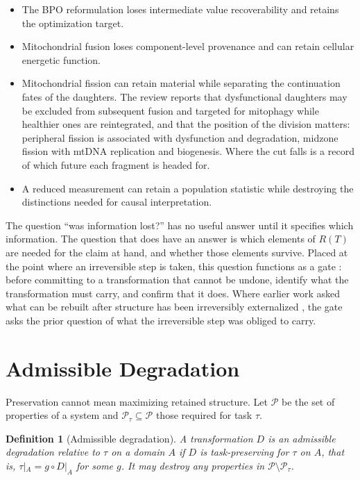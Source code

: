 \documentclass[11pt]{article}
\newtheorem{definition}{Definition}
\theoremstyle{remark}
\begin{document}
\begin{itemize}[leftmargin=1.5em]
\item The BPO reformulation loses intermediate value recoverability and retains the optimization target.
\item Mitochondrial fusion loses component-level provenance and can retain cellular energetic function.
\item Mitochondrial fission can retain material while separating the continuation fates of the daughters. The review reports that dysfunctional daughters may be excluded from subsequent fusion and targeted for mitophagy while healthier ones are reintegrated, and that the position of the division matters: peripheral fission is associated with dysfunction and degradation, midzone fission with mtDNA replication and biogenesis. Where the cut falls is a record of which future each fragment is headed for.
\item A reduced measurement can retain a population statistic while destroying the distinctions needed for causal interpretation.
\end{itemize}

The question ``was information lost?'' has no useful answer until it specifies which information. The question that does have an answer is which elements of $R(T)$ are needed for the claim at hand, and whether those elements survive. Placed at the point where an irreversible step is taken, this question functions as a gate \cite{reversibility}: before committing to a transformation that cannot be undone, identify what the transformation must carry, and confirm that it does. Where earlier work asked what can be rebuilt after structure has been irreversibly externalized \cite{reconstruction}, the gate asks the prior question of what the irreversible step was obliged to carry.

\section{Admissible Degradation}

Preservation cannot mean maximizing retained structure. Let $\mathcal P$ be the set of properties of a system and $\mathcal P_\tau\subseteq\mathcal P$ those required for task $\tau$.

\begin{definition}[Admissible degradation]
A transformation $D$ is an \emph{admissible degradation} relative to $\tau$ on a domain $A$ if $D$ is task-preserving for $\tau$ on $A$, that is, $\tau|_A = g\circ D|_A$ for some $g$. It may destroy any properties in $\mathcal P\setminus\mathcal P_\tau$.
\end{definition}
\end{document}
